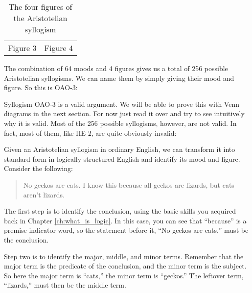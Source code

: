 \begin{table}[!ht]
\begin{tabu}{X[1,c] X[1,c]}
\\

\hspace{1.5em} Figure 3

&

\hspace{1.5em} Figure 4

\end{tabu}

\caption{The four figures of the Aristotelian syllogism}
\label{tab:four_figures}
\end{table}

The combination of 64 moods and 4 figures gives us a total of 256 possible Aristotelian syllogisms. We can name them by simply giving their mood and figure. So this is OAO-3:

\begin{kormanize}
\end{kormanize}

Syllogism OAO-3 is a valid argument. We will be able to prove this with Venn diagrams in the next section. For now just read it over and try to see intuitively why it is valid. Most of the 256 possible syllogisms, however, are not valid.  In fact, most of them, like IIE-2, are quite obviously invalid:

\begin{kormanize}
\end{kormanize}

Given an Aristotelian syllogism in ordinary English, we can transform it into standard form in logically structured English and identify its mood and figure. Consider the following:

\begin{quotation}
\noindent No geckos are cats. I know this because all geckos are lizards, but cats aren't lizards.
\end{quotation}

\noindent The first step is to identify the conclusion, using the basic skills you acquired back in Chapter \ref{ch:what_is_logic}. In this case, you can see that ``because'' is a premise indicator word, so the statement before it, ``No geckos are cats,'' must be the conclusion.

Step two is to identify the major, middle, and minor terms. Remember that the major term is the predicate of the conclusion, and the minor term is the subject. So here the major term is ``cats,'' the minor term is ``geckos.'' The leftover term, ``lizards,'' must then be the middle term.

